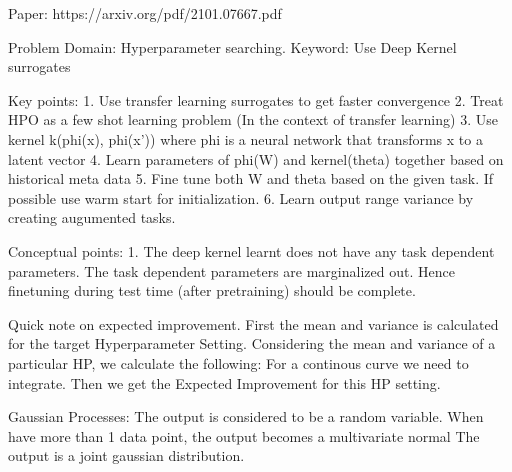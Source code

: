 \documentclass[12pt, twoside, ngerman]{report}
\begin{document}

\iffalse
Paper: https://arxiv.org/pdf/2101.07667.pdf

Problem Domain: Hyperparameter searching.
Keyword: Use Deep Kernel surrogates

Key points:
    1. Use transfer learning surrogates to get faster convergence
    2. Treat HPO as a few shot learning problem (In the context of transfer learning)
    3. Use kernel k(phi(x), phi(x')) where phi is a neural network that transforms x to a latent vector
    4. Learn parameters of phi(W) and kernel(theta) together based on historical meta data
    5. Fine tune both W and theta based on the given task. If possible use warm start for initialization.
    6. Learn output range variance by creating augumented tasks.

Conceptual points:
    1. The deep kernel learnt does not have any task dependent parameters.
       The task dependent parameters are marginalized out.
       Hence finetuning during test time (after pretraining) should be complete.

Quick note on expected improvement.
    First the mean and variance is calculated for the target Hyperparameter Setting.
    Considering the mean and variance of a particular HP, we calculate the following:
        For a continous curve we need to integrate.
    Then we get the Expected Improvement for this HP setting.


Gaussian Processes:
    The output is considered to be a random variable.
    When have more than 1 data point, the output becomes a multivariate normal
        The output is a joint gaussian distribution.
\end{document}
